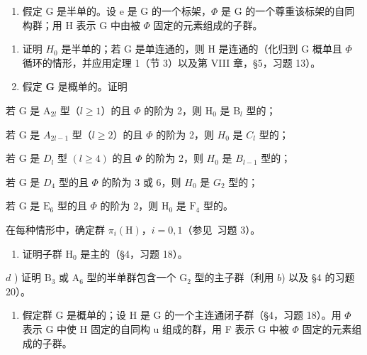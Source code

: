 \begin{enumerate}
\begin{enumerate}
\def\labelenumi{\arabic{enumi})}
\setcounter{enumi}{3}
\tightlist
\item
  假定 G 是半单的。设 e 是 G 的一个标架，\(\Phi\) 是 G 的一个尊重该标架的自同构群；用 H 表示 G 中由被 \(\Phi\) 固定的元素组成的子群。
\end{enumerate}

\begin{enumerate}
\def\labelenumi{\alph{enumi})}
\item
  证明 \(H_{0}\) 是半单的；若 G 是单连通的，则 H 是连通的（化归到 G 概单且 \(\Phi\) 循环的情形，并应用定理 1（节 3）以及第 VIII 章，§5，习题 13）。
\item
  假定 \(\mathbf{G}\) 是概单的。证明
\end{enumerate}

若 G 是 \(\mathrm{A}_{2l}\) 型（\(l \geq 1\)）的且 \(\varPhi\) 的阶为 2，则 \(\mathrm{H}_0\) 是 \(\mathrm{B}_l\) 型的；

若 G 是 \(A_{2l-1}\) 型（\(l \geq 2\)）的且 \(\Phi\) 的阶为 2，则 \(H_{0}\) 是 \(C_{l}\) 型的；

若 G 是 \(D_{l}\) 型 \((l \geq 4)\) 的且 \(\Phi\) 的阶为 2，则 \(H_{0}\) 是 \(B_{l-1}\) 型的；

若 G 是 \(D_{4}\) 型的且 \(\Phi\) 的阶为 3 或 6，则 \(H_{0}\) 是 \(G_{2}\) 型的；

若 \(\mathrm{G}\) 是 \(\mathrm{E}_6\) 型的且 \(\varPhi\) 的阶为 2，则 \(\mathrm{H}_0\) 是 \(\mathrm{F}_4\) 型的。

在每种情形中，确定群 \(\pi_i(\mathrm{H})\)，\(i = 0,1\)（参见~习题 3）。

\begin{enumerate}
\def\labelenumi{\alph{enumi})}
\setcounter{enumi}{2}
\tightlist
\item
  证明子群 \(\mathrm{H}_0\) 是主的（§4，习题 18）。
\end{enumerate}

\(d\) ) 证明 \(\mathrm{B}_3\) 或 \(\mathrm{A}_6\) 型的半单群包含一个 \(\mathrm{G}_2\) 型的主子群（利用 \(b\)) 以及 §4 的习题 20）。

\begin{enumerate}
\def\labelenumi{\arabic{enumi})}
\setcounter{enumi}{4}
\tightlist
\item
  假定群 G 是概单的；设 H 是 G 的一个主连通闭子群（§4，习题 18）。用 \(\Phi\) 表示 G 中使 H 固定的自同构 u 组成的群，用 F 表示 G 中被 \(\Phi\) 固定的元素组成的子群。
\end{enumerate}


\end{enumerate}
